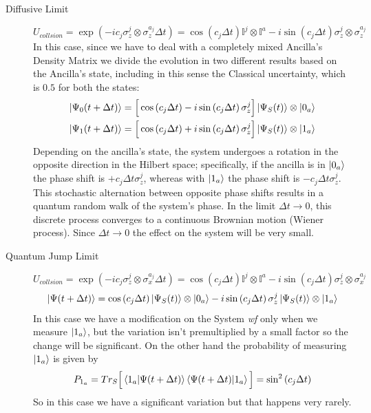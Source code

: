\documentclass[a4paper,12pt]{article}
\begin{document}
	\begin{description}
		\item[Diffusive Limit]
		\begin{equation}
			U_{collsion} = \exp \left(-i c_j \sigma_{z}^{j} \otimes \sigma_{z}^{a_j} \Delta t\right) = \cos \left(c_j \Delta t \right) \mathbb{I}^j \otimes \mathbb{I}^a - i \sin \left(c_j \Delta t \right) \sigma_{z}^{j} \otimes \sigma_{z}^{a_j}
			\label{eq:U_coll_Diff}
		\end{equation}
		In this case, since we have to deal with a completely mixed Ancilla's Density Matrix we divide the evolution in two different results based on the Ancilla's state, including in this sense the Classical uncertainty, which is $0.5$ for both the states:
		\begin{align}
			\ket{\Psi_0 (t + \Delta t) } = \Big[ \cos \left(c_j \Delta t \right) - i \sin \left(c_j \Delta t \right) \sigma_{z}^{j} \Big] \ket{\Psi_S(t)} \otimes \ket{0_a}
			\label{eq:psi_evol_Diff0} \\
			\ket{\Psi_1 (t + \Delta t) } = \Big[ \cos \left(c_j \Delta t \right) + i \sin \left(c_j \Delta t \right) \sigma_{z}^{j} \Big] \ket{\Psi_S(t)} \otimes \ket{1_a}
			\label{eq:psi_evol_Diff1}
		\end{align}
		Depending on the ancilla's state, the system undergoes a rotation in the opposite direction in the Hilbert space; specifically, if the ancilla is in $ \ket{0_a} $ the phase shift is $ + c_j \Delta t \sigma_{z}^{j} $, whereas with $ \ket{1_a} $ the phase shift is $ - c_j \Delta t \sigma_{z}^{j} $. This stochastic alternation between opposite phase shifts results in a quantum random walk of the system's phase. In the limit $ \Delta t \rightarrow 0 $, this discrete process converges to a continuous Brownian motion (Wiener process). Since $ \Delta t \rightarrow 0 $ the effect on the system will be very small.
		\item[Quantum Jump Limit]
		\begin{equation}
			U_{collsion} = \exp \left(-i c_j \sigma_{z}^{j} \otimes \sigma_{x}^{a_j} \Delta t\right) = \cos \left(c_j \Delta t \right) \mathbb{I}^j \otimes \mathbb{I}^a - i \sin \left(c_j \Delta t \right) \sigma_{z}^{j} \otimes \sigma_{x}^{a_j}
			\label{eq:U_coll_QJ}
		\end{equation}
		\begin{equation}
			\ket{\Psi (t + \Delta t) } = \cos \left(c_j \Delta t \right) \ket{\Psi_S (t)} \otimes \ket{0_a} - i \sin \left(c_j \Delta t \right) \sigma_{z}^{j} \ket{\Psi_S(t)} \otimes \ket{1_a}
			\label{eq:psi_evol_QJ}
		\end{equation}
		In this case we have a modification on the System \textit{wf} only when we measure $ \ket{1_a} $, but the variation isn't premultiplied by a small factor so the change will be significant. On the other hand the probability of measuring $ \ket{1_a} $ is given by
		\begin{equation}
			P_{1_a} = Tr_S \Big[\braket{1_a | \Psi(t + \Delta t)}\braket{\Psi(t + \Delta t) | 1_a}\Big] = \sin^{2}{\left(c_j \Delta t\right)}
			\label{eq:ancilla_probability}
		\end{equation}
		So in this case we have a significant variation but that happens very rarely.
	\end{description}
\end{document}
